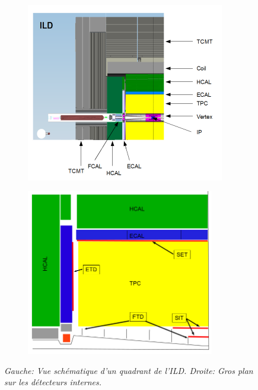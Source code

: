 \begin{figure}
	\centering
	\begin{subfigure}{0.5\textwidth}
		\includegraphics[width=0.95\textwidth]{graphics/ILD.png}
		
	\end{subfigure}%
	\begin{subfigure}{0.5\textwidth}
		\centering
		\includegraphics[width=0.9\textwidth]{graphics/ILDtracking.png}
		
	\end{subfigure}
	\caption{\sl Gauche: Vue sch\'ematique d'un quadrant de l'ILD. Droite: Gros plan sur les détecteurs internes.}
	\label{fig:ILDSchemeF}
\end{figure}
\newpage
